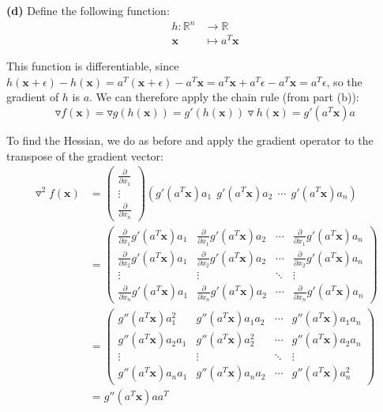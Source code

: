 \documentclass{article}
\begin{document}
\clearpage

\textbf{(d)} Define the following function:
\begin{align*}
  h: \mathbb{R}^n &\to \mathbb{R}\\
  \mathbf{x} &\mapsto a^T\mathbf{x}
\end{align*}

This function is differentiable, since 
$h(\mathbf{x} + \epsilon) - h(\mathbf{x}) = 
a^T(\mathbf{x} + \epsilon) - a^T\mathbf{x} =
a^T\mathbf{x} + a^T\epsilon - a^T\mathbf{x} = a^T\epsilon$, so the gradient of $h$ is $a$.
We can therefore apply the chain rule (from part (b)):
$$\triangledown f(\mathbf{x}) = 
\triangledown g(h(\mathbf{x})) = 
g'(h(\mathbf{x})) \triangledown h(\mathbf{x}) =
g'(a^T\mathbf{x}) a$$

To find the Hessian, we do as before and apply the gradient operator to the transpose
of the gradient vector:
\begin{align*}
\triangledown^2 f(\mathbf{x}) &= 
\begin{pmatrix}
  \frac{\partial}{\partial x_1} \\
  \vdots\\
  \frac{\partial}{\partial x_n}
\end{pmatrix}
(g'(a^T\mathbf{x})a_1 \ \ g'(a^T\mathbf{x})a_2 \ \ \cdots \ \ g'(a^T\mathbf{x})a_n) \\ &=
\begin{pmatrix}
  \frac{\partial}{\partial x_1} g'(a^T\mathbf{x})a_1 & \frac{\partial}{\partial x_1} g'(a^T\mathbf{x})a_2 & \cdots & \frac{\partial}{\partial x_1} g'(a^T\mathbf{x})a_n\\
  \frac{\partial}{\partial x_2} g'(a^T\mathbf{x})a_1 & \frac{\partial}{\partial x_2} g'(a^T\mathbf{x})a_2 & \cdots & \frac{\partial}{\partial x_2} g'(a^T\mathbf{x})a_n\\
  \vdots & \vdots & \ddots & \vdots\\
  \frac{\partial}{\partial x_n} g'(a^T\mathbf{x})a_1 & \frac{\partial}{\partial x_n} g'(a^T\mathbf{x})a_2 & \cdots & \frac{\partial}{\partial x_n} g'(a^T\mathbf{x})a_n
\end{pmatrix} \\ &=
\begin{pmatrix}
  g''(a^T\mathbf{x})a_1^2 & g''(a^T\mathbf{x})a_1a_2 & \cdots & g''(a^T\mathbf{x})a_1a_n\\
  g''(a^T\mathbf{x})a_2a_1 & g''(a^T\mathbf{x})a_2^2 & \cdots & g''(a^T\mathbf{x})a_2a_n\\
  \vdots & \vdots & \ddots & \vdots\\
  g''(a^T\mathbf{x})a_na_1 & g''(a^T\mathbf{x})a_na_2 & \cdots & g''(a^T\mathbf{x})a_n^2
\end{pmatrix} \\ &=
g''(a^T\mathbf{x})a a^T
\end{align*}
\end{document}
